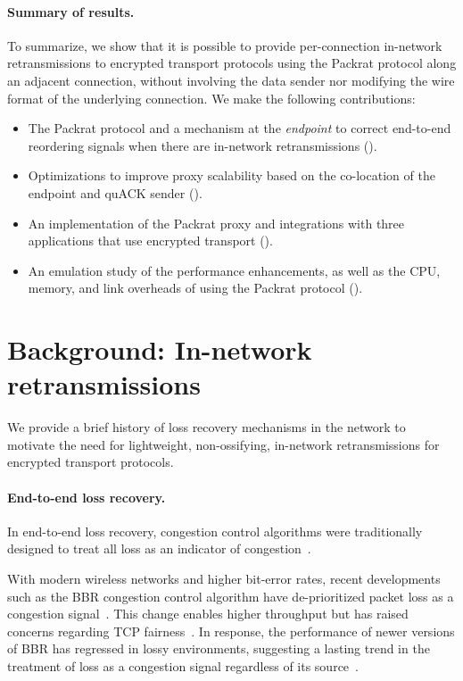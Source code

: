 \paragraph{Summary of results.}
To summarize, we show that it is possible to provide per-connection in-network
retransmissions to encrypted transport protocols using the Packrat protocol along
an adjacent connection, without involving the data sender nor modifying the
wire format of the underlying connection. We make the following contributions:

\begin{itemize}[noitemsep]
    \item The Packrat protocol and a mechanism at the \textit{endpoint} to correct
     end-to-end reordering signals when there are in-network retransmissions
     ().
    \item Optimizations to improve proxy
     scalability based on the co-location of the endpoint and quACK sender
     ().
    \item An implementation of the Packrat proxy and integrations with three
     applications that use encrypted transport ().
    \item An emulation study of the performance enhancements, as well as the CPU,
     memory, and link overheads of using the Packrat protocol ().
\end{itemize}

\section{Background: In-network retransmissions}
\label{sec:packrat:background}

We provide a brief history of loss recovery mechanisms in the network to
motivate the need for lightweight, non-ossifying, in-network retransmissions
for encrypted transport protocols.

\paragraph{End-to-end loss recovery.}

In end-to-end loss recovery,
congestion control algorithms were traditionally designed to treat all loss as an indicator of
congestion~\cite{rfc5681tcp,rfc2001tcp}.

With modern wireless networks and higher bit-error rates, recent developments
such as the BBR congestion control
algorithm have de-prioritized packet loss as a congestion
signal~\cite{cardwell2017bbr}. This change enables higher throughput but has
raised concerns regarding TCP fairness~\cite
{ware2019modeling,philip2024prudentia}. In response, the performance of newer
versions of BBR has regressed in lossy environments, suggesting a lasting trend
in the treatment of loss as a congestion signal regardless of its source~\cite
{yuan2025internet}.

